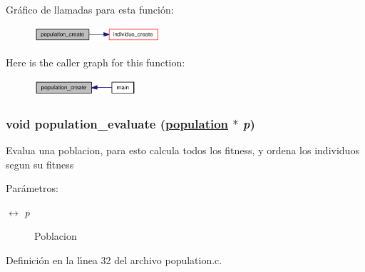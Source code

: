 Gr\'{a}fico de llamadas para esta funci\'{o}n:\begin{figure}[H]
\begin{center}
\leavevmode
\includegraphics[width=133pt]{group__genetic_gc7ba874876f18abab66f0a42f32b98cc_gc7ba874876f18abab66f0a42f32b98cc_cgraph}
\end{center}
\end{figure}


Here is the caller graph for this function:\begin{figure}[H]
\begin{center}
\leavevmode
\includegraphics[width=107pt]{group__genetic_gc7ba874876f18abab66f0a42f32b98cc_gc7ba874876f18abab66f0a42f32b98cc_icgraph}
\end{center}
\end{figure}
\hypertarget{group__genetic_g229293c432c5ef4f70b1ee94c109bb1a_g229293c432c5ef4f70b1ee94c109bb1a}{
\subsubsection[population\_\-evaluate]{\setlength{\rightskip}{0pt plus 5cm}void population\_\-evaluate (\hyperlink{struct__population}{population} $\ast$ {\em p})}}
\label{group__genetic_g229293c432c5ef4f70b1ee94c109bb1a_g229293c432c5ef4f70b1ee94c109bb1a}


Evalua una poblacion, para esto calcula todos los fitness, y ordena los individuos segun su fitness

\begin{Desc}
\item[Par\'{a}metros:]
\begin{description}
\item[\mbox{$\leftrightarrow$} {\em p}]Poblacion \end{description}
\end{Desc}


Definici\'{o}n en la l\'{\i}nea 32 del archivo population.c.

